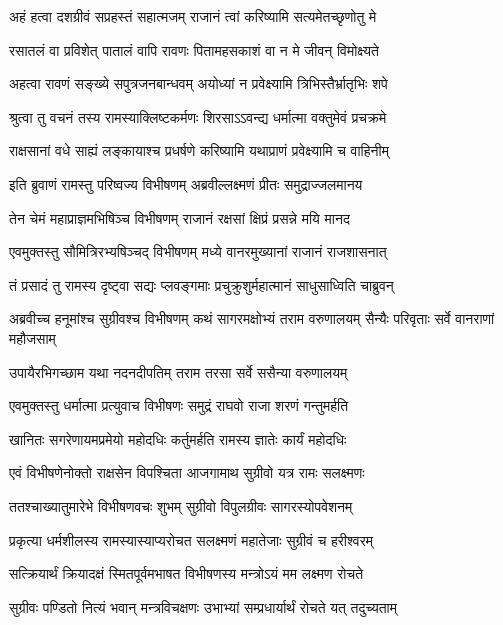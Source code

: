 \twolineshloka
{अहं हत्वा दशग्रीवं सप्रहस्तं सहात्मजम्}
{राजानं त्वां करिष्यामि सत्यमेतच्छृणोतु मे} %

\twolineshloka
{रसातलं वा प्रविशेत् पातालं वापि रावणः}
{पितामहसकाशं वा न मे जीवन् विमोक्ष्यते} %

\twolineshloka
{अहत्वा रावणं सङ्ख्ये सपुत्रजनबान्धवम्}
{अयोध्यां न प्रवेक्ष्यामि त्रिभिस्तैर्भ्रातृभिः शपे} %

\twolineshloka
{श्रुत्वा तु वचनं तस्य रामस्याक्लिष्टकर्मणः}
{शिरसाऽऽवन्द्य धर्मात्मा वक्तुमेवं प्रचक्रमे} %

\twolineshloka
{राक्षसानां वधे साह्यं लङ्कायाश्च प्रधर्षणे}
{करिष्यामि यथाप्राणं प्रवेक्ष्यामि च वाहिनीम्} %

\twolineshloka
{इति ब्रुवाणं रामस्तु परिष्वज्य विभीषणम्}
{अब्रवील्लक्ष्मणं प्रीतः समुद्राज्जलमानय} %

\twolineshloka
{तेन चेमं महाप्राज्ञमभिषिञ्च विभीषणम्}
{राजानं रक्षसां क्षिप्रं प्रसन्ने मयि मानद} %

\twolineshloka
{एवमुक्तस्तु सौमित्रिरभ्यषिञ्चद् विभीषणम्}
{मध्ये वानरमुख्यानां राजानं राजशासनात्} %

\twolineshloka
{तं प्रसादं तु रामस्य दृष्ट्वा सद्यः प्लवङ्गमाः}
{प्रचुक्रुशुर्महात्मानं साधुसाध्विति चाब्रुवन्} %

\threelineshloka
{अब्रवीच्च हनूमांश्च सुग्रीवश्च विभीषणम्}
{कथं सागरमक्षोभ्यं तराम वरुणालयम्}
{सैन्यैः परिवृताः सर्वे वानराणां महौजसाम्} %

\twolineshloka
{उपायैरभिगच्छाम यथा नदनदीपतिम्}
{तराम तरसा सर्वे ससैन्या वरुणालयम्} %

\twolineshloka
{एवमुक्तस्तु धर्मात्मा प्रत्युवाच विभीषणः}
{समुद्रं राघवो राजा शरणं गन्तुमर्हति} %

\twolineshloka
{खानितः सगरेणायमप्रमेयो महोदधिः}
{कर्तुमर्हति रामस्य ज्ञातेः कार्यं महोदधिः} %

\twolineshloka
{एवं विभीषणेनोक्तो राक्षसेन विपश्चिता}
{आजगामाथ सुग्रीवो यत्र रामः सलक्ष्मणः} %

\twolineshloka
{ततश्चाख्यातुमारेभे विभीषणवचः शुभम्}
{सुग्रीवो विपुलग्रीवः सागरस्योपवेशनम्} %

\twolineshloka
{प्रकृत्या धर्मशीलस्य रामस्यास्याप्यरोचत}
{सलक्ष्मणं महातेजाः सुग्रीवं च हरीश्वरम्} %

\twolineshloka
{सत्क्रियार्थं क्रियादक्षं स्मितपूर्वमभाषत}
{विभीषणस्य मन्त्रोऽयं मम लक्ष्मण रोचते} %

\twolineshloka
{सुग्रीवः पण्डितो नित्यं भवान् मन्त्रविचक्षणः}
{उभाभ्यां सम्प्रधार्यार्थं रोचते यत् तदुच्यताम्} %


